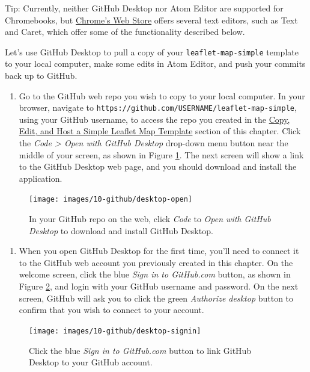 \documentclass[
  english,
]{book}
\providecommand{\tightlist}{%
  \setlength{\itemsep}{0pt}\setlength{\parskip}{0pt}}
\begin{document}
Tip: Currently, neither GitHub Desktop nor Atom Editor are supported for Chromebooks, but \href{https://chrome.google.com/webstore}{Chrome's Web Store} offers several text editors, such as Text and Caret, which offer some of the functionality described below.

Let's use GitHub Desktop to pull a copy of your \texttt{leaflet-map-simple} template to your local computer, make some edits in Atom Editor, and push your commits back up to GitHub.

\begin{enumerate}
\def\labelenumi{\arabic{enumi}.}
\tightlist
\item
  Go to the GitHub web repo you wish to copy to your local computer. In your browser, navigate to \texttt{https://github.com/USERNAME/leaflet-map-simple}, using your GitHub username, to access the repo you created in the \href{copy-leaflet.html}{Copy, Edit, and Host a Simple Leaflet Map Template} section of this chapter. Click the \emph{Code \textgreater{} Open with GitHub Desktop} drop-down menu button near the middle of your screen, as shown in Figure \ref{fig:desktop-open}. The next screen will show a link to the GitHub Desktop web page, and you should download and install the application.
\end{enumerate}



\begin{figure}
\texttt{[image: images/10-github/desktop-open]} \caption{In your GitHub repo on the web, click \emph{Code} to \emph{Open with GitHub Desktop} to download and install GitHub Desktop.}\label{fig:desktop-open}
\end{figure}

\begin{enumerate}
\def\labelenumi{\arabic{enumi}.}
\setcounter{enumi}{1}
\tightlist
\item
  When you open GitHub Desktop for the first time, you'll need to connect it to the GitHub web account you previously created in this chapter. On the welcome screen, click the blue \emph{Sign in to GitHub.com} button, as shown in Figure \ref{fig:desktop-signin}, and login with your GitHub username and password. On the next screen, GitHub will ask you to click the green \emph{Authorize desktop} button to confirm that you wish to connect to your account.
\end{enumerate}



\begin{figure}
\texttt{[image: images/10-github/desktop-signin]} \caption{Click the blue \emph{Sign in to GitHub.com} button to link GitHub Desktop to your GitHub account.}\label{fig:desktop-signin}
\end{figure}
\end{document}
